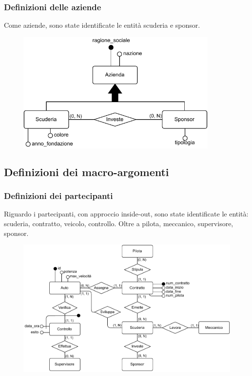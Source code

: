 \documentclass[11pt]{article}
\begin{document}
\subsubsection{Definizioni delle aziende}
Come aziende, sono state identificate le entità scuderia e sponsor. 
\begin{figure}[H]
    \centering
    \includegraphics[width=10cm]{../er/gare_aziende.pdf}
\end{figure}

\subsection{Definizioni dei macro-argomenti}
\subsubsection{Definizioni dei partecipanti}
Riguardo i partecipanti, con approccio inside-out, sono state identificate le entità: scuderia, contratto, veicolo, controllo. Oltre a pilota, meccanico, supervisore, sponsor.
\begin{figure}[H]
    \centering
    \includegraphics[width=15.5cm]{../er/gare_scuderie.pdf}
\end{figure}
\end{document}
